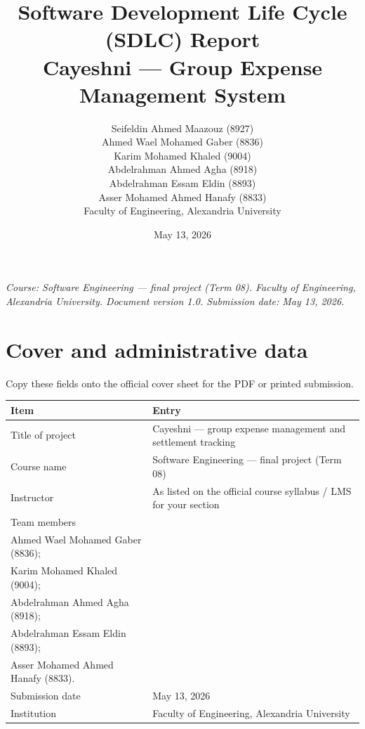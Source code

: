 \documentclass[11pt,a4paper]{article}
\title{Software Development Life Cycle (SDLC) Report\\[0.6em]Cayeshni --- Group Expense Management System}
\author{Seifeldin Ahmed Maazouz (8927)\\
Ahmed Wael Mohamed Gaber (8836)\\
Karim Mohamed Khaled (9004)\\
Abdelrahman Ahmed Agha (8918)\\
Abdelrahman Essam Eldin (8893)\\
Asser Mohamed Ahmed Hanafy (8833)\\[0.75em]
Faculty of Engineering, Alexandria University}
\date{May 13, 2026}
\begin{document}
\maketitle
\thispagestyle{empty}
\vfill
\noindent\textit{Course: Software Engineering --- final project (Term 08). Faculty of Engineering, Alexandria University. Document version 1.0. Submission date: May 13, 2026.}
\vfill
\clearpage

\setcounter{page}{1}
\tableofcontents
\clearpage

\setcounter{page}{1}

\section{Cover and administrative data}

\noindent Copy these fields onto the official cover sheet for the PDF or printed submission.

\begin{center}
\begin{tabular}{@{}p{}p{}@{}}
\toprule
\textbf{Item} & \textbf{Entry} \\
\midrule
Title of project & Cayeshni --- group expense management and settlement tracking \\
Course name & Software Engineering --- final project (Term 08) \\
Instructor & As listed on the official course syllabus / LMS for your section \\
Team members &
\begin{minipage}[t]{0.53\textwidth}\raggedright
{\small\noindent Seifeldin Ahmed Maazouz (8927);\\
Ahmed Wael Mohamed Gaber (8836);\\
Karim Mohamed Khaled (9004);\\
Abdelrahman Ahmed Agha (8918);\\
Abdelrahman Essam Eldin (8893);\\
Asser Mohamed Ahmed Hanafy (8833).%
}%
\end{minipage} \\
Submission date & May 13, 2026 \\
Institution & Faculty of Engineering, Alexandria University \\
\bottomrule
\end{tabular}
\end{center}
\end{document}
